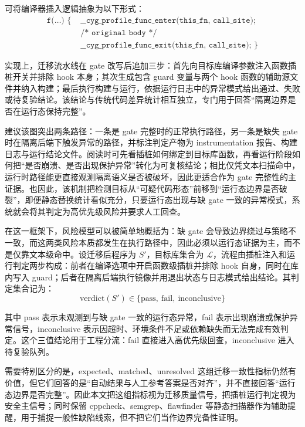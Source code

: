 \documentclass[UTF8,a4paper,12pt,twoside]{ctexart}  %
\begin{document}
可将编译器插入逻辑抽象为以下形式：
\begin{equation}
  \begin{aligned}
    \texttt{f(\ldots)\ \{\ } & \texttt{\_\_cyg\_profile\_func\_enter(this\_fn, call\_site);}\   \\
                             & \texttt{/* original body */}\                                    \\
                             & \texttt{\_\_cyg\_profile\_func\_exit(this\_fn, call\_site);\ \}}
  \end{aligned}
\end{equation}

实现上，迁移流水线在 gate
改写后追加三步：首先向目标库编译参数注入函数插桩开关并排除 hook
本身；其次生成包含 guard 变量与两个 hook
函数的辅助源文件并纳入构建；最后执行构建与运行，依据运行日志中的异常模式给出通过、失败或待复验结论。该结论与传统代码差异统计相互独立，专门用于回答``隔离边界是否在运行态保持完整''。

建议该图突出两条路径：一条是 gate 完整时的正常执行路径，另一条是缺失
gate 时在隔离后端下触发异常的路径，并标注判定产物为 instrumentation
报告、构建日志与运行结论文件。阅读时可先看插桩如何绑定到目标库函数，再看运行阶段如何把``是否崩溃、是否出现保护异常''转化为可复核结论；相比仅凭文本扫描命中，运行时路径能更直接观测隔离语义是否被破坏，因此更适合作为 gate 完整性的主证据。也因此，该机制把检测目标从``可疑代码形态''前移到``运行态边界是否破裂''，即便静态替换统计看似充分，只要运行态出现与缺 gate 一致的异常模式，系统就会将其判定为高优先级风险并要求人工回查。

在这一框架下，风险模型可以被简单地概括为：缺 gate
会导致边界绕过与策略不一致，而这两类风险本质都发生在执行路径中，因此必须以运行态证据为主，而不是仅靠文本级命中。设迁移后程序为
\(S'\)，目标库集合为
\(\mathcal{L}\)，流程由插桩注入和运行判定两步构成：前者在编译选项中开启函数级插桩并排除
hook 自身，同时在库内写入
guard；后者在隔离后端执行镜像并用退出状态与日志模式给出结论。其判定集合记为：
\begin{equation}
  \text{verdict}(S') \in \{\text{pass},\ \text{fail},\ \text{inconclusive}\}
\end{equation}

其中 pass 表示未观测到与缺 gate 一致的运行态异常，fail
表示出现崩溃或保护异常信号，inconclusive
表示因超时、环境条件不足或依赖缺失而无法完成有效判定。这个三值结论用于工程分流：fail
直接进入高优先级回查，inconclusive 进入待复验队列。

需要特别区分的是，expected、matched、unresolved
这组迁移一致性指标仍然有价值，但它们回答的是``自动结果与人工参考答案是否对齐''，并不直接回答``运行态边界是否完整''。因此本文把这组指标视为迁移质量信号，把插桩运行判定视为安全主信号；同时保留
cppcheck、semgrep、flawfinder
等静态扫描器\cite{11,12,13}作为辅助提醒，用于捕捉一般性缺陷线索，但不把它们当作边界完备性证明。
\end{document}
